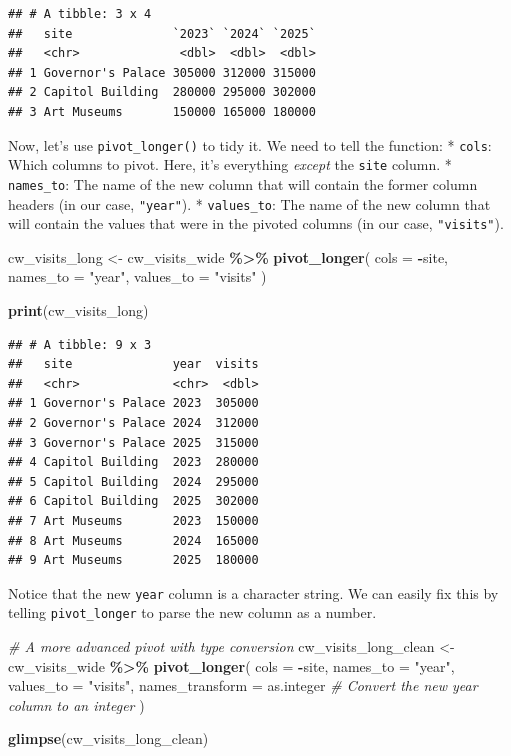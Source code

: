 \documentclass[
  11pt,
]{article}
\newenvironment{Shaded}{\begin{snugshade}}{\end{snugshade}}
\newcommand{\AttributeTok}[1]{\textcolor[rgb]{0.13,0.29,0.53}{#1}}
\newcommand{\CommentTok}[1]{\textcolor[rgb]{0.56,0.35,0.01}{\textit{#1}}}
\newcommand{\FunctionTok}[1]{\textcolor[rgb]{0.13,0.29,0.53}{\textbf{#1}}}
\newcommand{\NormalTok}[1]{#1}
\newcommand{\OtherTok}[1]{\textcolor[rgb]{0.56,0.35,0.01}{#1}}
\newcommand{\SpecialCharTok}[1]{\textcolor[rgb]{0.81,0.36,0.00}{\textbf{#1}}}
\newcommand{\StringTok}[1]{\textcolor[rgb]{0.31,0.60,0.02}{#1}}
\begin{document}
\begin{verbatim}
## # A tibble: 3 x 4
##   site              `2023` `2024` `2025`
##   <chr>              <dbl>  <dbl>  <dbl>
## 1 Governor's Palace 305000 312000 315000
## 2 Capitol Building  280000 295000 302000
## 3 Art Museums       150000 165000 180000
\end{verbatim}

Now, let's use \texttt{pivot\_longer()} to tidy it. We need to tell the
function: * \texttt{cols}: Which columns to pivot. Here, it's everything
\emph{except} the \texttt{site} column. * \texttt{names\_to}: The name
of the new column that will contain the former column headers (in our
case, \texttt{"year"}). * \texttt{values\_to}: The name of the new
column that will contain the values that were in the pivoted columns (in
our case, \texttt{"visits"}).

\begin{Shaded}
\begin{Highlighting}[]
\NormalTok{cw\_visits\_long }\OtherTok{\textless{}{-}}\NormalTok{ cw\_visits\_wide }\SpecialCharTok{\%\textgreater{}\%}
  \FunctionTok{pivot\_longer}\NormalTok{(}
    \AttributeTok{cols =} \SpecialCharTok{{-}}\NormalTok{site, }
    \AttributeTok{names\_to =} \StringTok{"year"}\NormalTok{,}
    \AttributeTok{values\_to =} \StringTok{"visits"}
\NormalTok{  )}

\FunctionTok{print}\NormalTok{(cw\_visits\_long)}
\end{Highlighting}
\end{Shaded}

\begin{verbatim}
## # A tibble: 9 x 3
##   site              year  visits
##   <chr>             <chr>  <dbl>
## 1 Governor's Palace 2023  305000
## 2 Governor's Palace 2024  312000
## 3 Governor's Palace 2025  315000
## 4 Capitol Building  2023  280000
## 5 Capitol Building  2024  295000
## 6 Capitol Building  2025  302000
## 7 Art Museums       2023  150000
## 8 Art Museums       2024  165000
## 9 Art Museums       2025  180000
\end{verbatim}

Notice that the new \texttt{year} column is a character string. We can
easily fix this by telling \texttt{pivot\_longer} to parse the new
column as a number.

\begin{Shaded}
\begin{Highlighting}[]
\CommentTok{\# A more advanced pivot with type conversion}
\NormalTok{cw\_visits\_long\_clean }\OtherTok{\textless{}{-}}\NormalTok{ cw\_visits\_wide }\SpecialCharTok{\%\textgreater{}\%}
  \FunctionTok{pivot\_longer}\NormalTok{(}
    \AttributeTok{cols =} \SpecialCharTok{{-}}\NormalTok{site,}
    \AttributeTok{names\_to =} \StringTok{"year"}\NormalTok{,}
    \AttributeTok{values\_to =} \StringTok{"visits"}\NormalTok{,}
    \AttributeTok{names\_transform =}\NormalTok{ as.integer }\CommentTok{\# Convert the new \textquotesingle{}year\textquotesingle{} column to an integer}
\NormalTok{  )}

\FunctionTok{glimpse}\NormalTok{(cw\_visits\_long\_clean)}
\end{Highlighting}
\end{Shaded}
\end{document}
